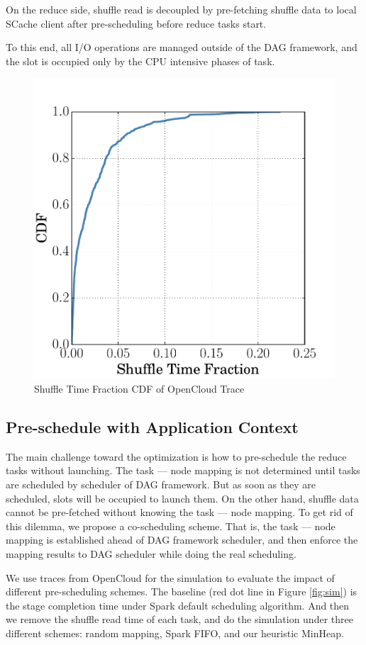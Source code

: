On the reduce side, shuffle read is decoupled by pre-fetching shuffle data to local SCache client after pre-scheduling before reduce tasks start.

To this end, all I/O operations are managed outside of the DAG framework, and the slot is occupied only by the CPU intensive phases of task.

\begin{figure}
	\centering
	\includegraphics[width=0.75\linewidth]{fig/reduce_cdf}
	\caption{Shuffle Time Fraction CDF of OpenCloud Trace}
	\label{fig:cdf}
\end{figure}

\subsection{Pre-schedule with Application Context}
The main challenge toward the optimization is how to pre-schedule the reduce tasks without launching. The task --- node mapping is not determined until tasks are scheduled by scheduler of DAG framework. But as soon as they are scheduled, slots will be occupied to launch them. On the other hand, shuffle data cannot be pre-fetched without knowing the task --- node mapping.
To get rid of this dilemma, we propose a co-scheduling scheme. That is, the task --- node mapping is established ahead of DAG framework scheduler, and then enforce the mapping results to DAG scheduler while doing the real scheduling.

We use traces from OpenCloud \cite{opencloudtrace} for the simulation to evaluate the impact of different pre-scheduling schemes. The baseline (red dot line in Figure \ref{fig:sim}) is the stage completion time under Spark default scheduling algorithm. And then we remove the shuffle read time of each task, and do the simulation under three different schemes: random mapping, Spark FIFO, and our heuristic MinHeap.

